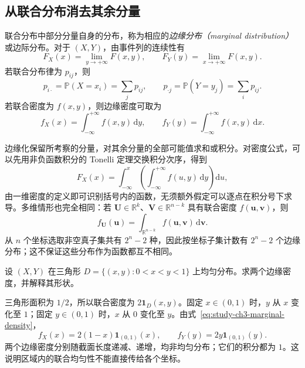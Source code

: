 \subsection{从联合分布消去其余分量}

\begin{definition}
\label{def:study-ch3-marginal-distributions}
联合分布中部分分量自身的分布，称为相应的\emph{边缘分布（marginal distribution）}或边际分布。对于 $(X,Y)$，由事件列的连续性有
\begin{equation}
  F_X(x)=\lim_{y\to+\infty}F(x,y),\qquad
  F_Y(y)=\lim_{x\to+\infty}F(x,y).
  \label{eq:study-ch3-marginal-cdf}
\end{equation}
若联合分布律为 $p_{ij}$，则
\begin{equation}
  p_{i\cdot}=\mathbb P(X=x_i)=\sum_jp_{ij},\qquad
  p_{\cdot j}=\mathbb P(Y=y_j)=\sum_ip_{ij}.
  \label{eq:study-ch3-marginal-pmf}
\end{equation}
若联合密度为 $f(x,y)$，则边缘密度可取为
\begin{equation}
  f_X(x)=\int_{-\infty}^{+\infty}f(x,y)\,\mathrm dy,\qquad
  f_Y(y)=\int_{-\infty}^{+\infty}f(x,y)\,\mathrm dx.
  \label{eq:study-ch3-marginal-density}
\end{equation}
\end{definition}

边缘化保留所考察的分量，对其余分量的全部可能值求和或积分。对密度公式，可以先用非负函数积分的 Tonelli 定理交换积分次序，得到
\[
  F_X(x)=\int_{-\infty}^x
    \left(\int_{-\infty}^{+\infty}f(u,y)\,\mathrm dy\right)\mathrm du,
\]
由一维密度的定义即可识别括号内的函数，无须额外假定可以逐点在积分号下求导。多维情形也完全相同：若 $\boldsymbol U\in\mathbb R^k$、$\boldsymbol V\in\mathbb R^{n-k}$ 具有联合密度 $f(\boldsymbol u,\boldsymbol v)$，则
\[
  f_{\boldsymbol U}(\boldsymbol u)
  =\int_{\mathbb R^{n-k}}f(\boldsymbol u,\boldsymbol v)\,\mathrm d\boldsymbol v.
\]
从 $n$ 个坐标选取非空真子集共有 $2^n-2$ 种，因此按坐标子集计数有 $2^n-2$ 个边缘分布；这不保证这些分布作为函数都互不相同。

\begin{example}
\label{ex:study-ch3-triangle-marginals}
设 $(X,Y)$ 在三角形 $D=\{(x,y):0<x<y<1\}$ 上均匀分布。求两个边缘密度，并解释其形状。
\end{example}

\begin{solve}
三角形面积为 $1/2$，所以联合密度为 $2\boldsymbol 1_D(x,y)$。固定 $x\in(0,1)$ 时，$y$ 从 $x$ 变化至 $1$；固定 $y\in(0,1)$ 时，$x$ 从 $0$ 变化至 $y$。由式~\eqref{eq:study-ch3-marginal-density}，
\[
  f_X(x)=2(1-x)\boldsymbol 1_{(0,1)}(x),\qquad
  f_Y(y)=2y\boldsymbol 1_{(0,1)}(y).
\]
两个边缘密度分别随截面长度递减、递增，均非均匀分布；它们的积分都为 $1$。这说明区域内的联合均匀性不能直接传给各个坐标。
\end{solve}

